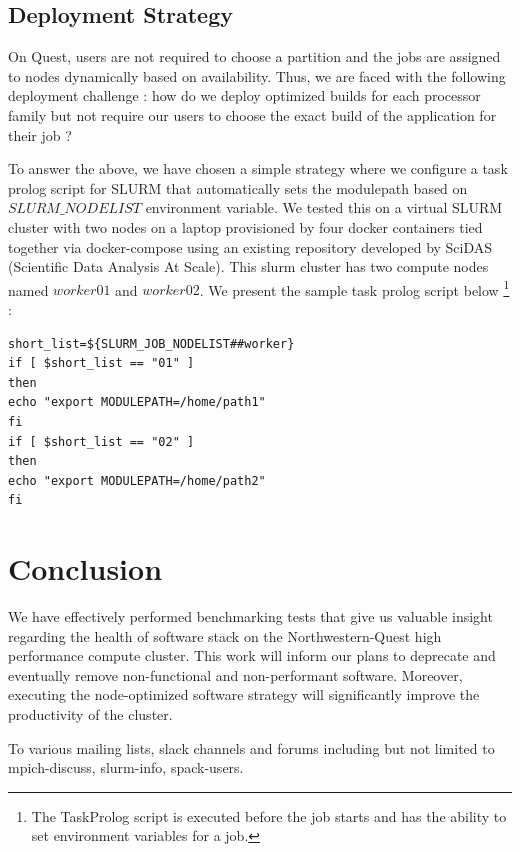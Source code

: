 \documentclass[manuscript,screen]{acmart}
\begin{document}
\subsection{Deployment Strategy}
On Quest, users are not required to choose a partition and the jobs are assigned to nodes dynamically based on availability. Thus, we are faced with the following deployment challenge : how do we deploy optimized builds for each processor family but not require our users to choose the exact build of the application for their job ?

To answer the above, we have chosen a simple strategy where we configure a task prolog script for SLURM that automatically sets the modulepath based on $SLURM\_NODELIST$ environment variable. We tested this on a virtual SLURM cluster with two nodes on a laptop provisioned by four docker containers tied together via docker-compose using an existing repository \cite{slurmdocker_repository} developed by SciDAS (Scientific Data Analysis At Scale). This slurm cluster has two compute nodes named $worker01$ and $worker02$. We present the sample task prolog script below \footnote{The TaskProlog script is executed before the job starts and has the ability to set environment variables for a job.\cite{slurm_taskprolog}} : 

\begin{verbatim}
short_list=${SLURM_JOB_NODELIST##worker}
if [ $short_list == "01" ]
then
echo "export MODULEPATH=/home/path1"
fi
if [ $short_list == "02" ]
then
echo "export MODULEPATH=/home/path2"
fi
\end{verbatim}


\section{Conclusion}

We have effectively performed benchmarking tests that give us valuable insight regarding the health of software stack on the Northwestern-Quest high performance compute cluster. This work will inform our plans to deprecate and eventually remove non-functional and non-performant software. Moreover, executing the node-optimized software strategy will significantly improve the productivity of the cluster.

\begin{acks}
To various mailing lists, slack channels and forums including but not limited to mpich-discuss, slurm-info, spack-users.
\end{acks}
\end{document}
